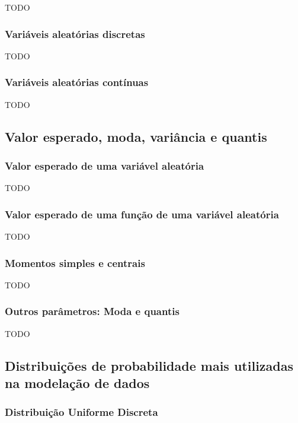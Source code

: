 \documentclass[11pt, a4paper]{article}
\begin{document}
TODO

\subsubsection*{Variáveis aleatórias discretas}

TODO

\subsubsection*{Variáveis aleatórias contínuas}

TODO


\subsection{Valor esperado, moda, variância e quantis}

\subsubsection*{Valor esperado de uma variável aleatória}

TODO

\subsubsection*{Valor esperado de uma função de uma variável aleatória}

TODO

\subsubsection*{Momentos simples e centrais}

TODO

\subsubsection*{Outros parâmetros: Moda e quantis}

TODO

\subsection{Distribuições de probabilidade mais utilizadas na modelação de dados}

\subsubsection*{Distribuição Uniforme Discreta}
\end{document}
